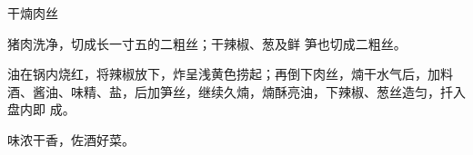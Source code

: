 \begin{recipe}{干煵肉丝}

\ingredients


\cooking

\step 猪肉洗净，切成长一寸五的二粗丝；干辣椒、葱及鲜 笋也切成二粗丝。

\step 油在锅内烧红，将辣椒放下，炸呈浅黄色捞起；再倒下肉丝，煵干水气后，加料
酒、酱油、味精、盐，后加笋丝，继续久煵，煵酥亮油，下辣椒、葱丝造匀，扦入盘内即
成。

\notes

味浓干香，佐酒好菜。

\end{recipe}

